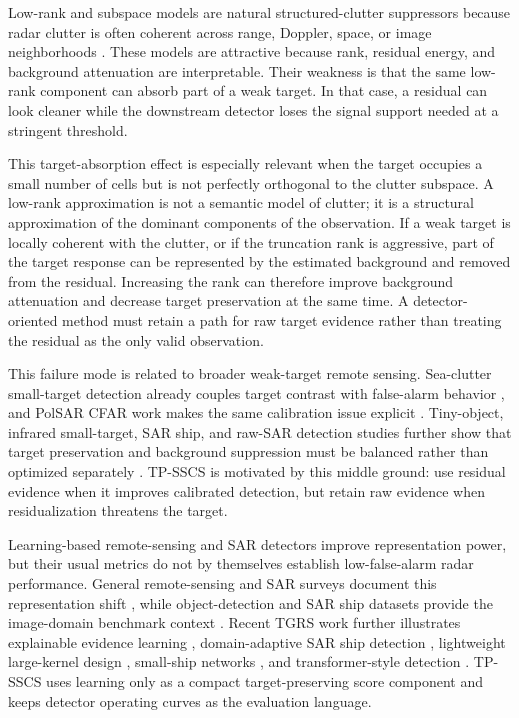 \documentclass[journal]{IEEEtran}
\begin{document}
Low-rank and subspace models are natural structured-clutter suppressors because radar clutter is often coherent across range, Doppler, space, or image neighborhoods \cite{candes2011rpca,vaswani2018robustsubspace}. These models are attractive because rank, residual energy, and background attenuation are interpretable. Their weakness is that the same low-rank component can absorb part of a weak target. In that case, a residual can look cleaner while the downstream detector loses the signal support needed at a stringent threshold.

This target-absorption effect is especially relevant when the target occupies a small number of cells but is not perfectly orthogonal to the clutter subspace. A low-rank approximation is not a semantic model of clutter; it is a structural approximation of the dominant components of the observation. If a weak target is locally coherent with the clutter, or if the truncation rank is aggressive, part of the target response can be represented by the estimated background and removed from the residual. Increasing the rank can therefore improve background attenuation and decrease target preservation at the same time. A detector-oriented method must retain a path for raw target evidence rather than treating the residual as the only valid observation.

This failure mode is related to broader weak-target remote sensing. Sea-clutter small-target detection already couples target contrast with false-alarm behavior \cite{panagopoulos2004smalltarget}, and PolSAR CFAR work makes the same calibration issue explicit \cite{liu2020polsarcfar}. Tiny-object, infrared small-target, SAR ship, and raw-SAR detection studies further show that target preservation and background suppression must be balanced rather than optimized separately \cite{chen2022drenet,liu2025pgdn,wang2019ssdd,leng2023rawsar}. TP-SSCS is motivated by this middle ground: use residual evidence when it improves calibrated detection, but retain raw evidence when residualization threatens the target.

Learning-based remote-sensing and SAR detectors improve representation power, but their usual metrics do not by themselves establish low-false-alarm radar performance. General remote-sensing and SAR surveys document this representation shift \cite{zhu2017deeprs,zhu2021deeplearningsar,eldarymli2016saratr}, while object-detection and SAR ship datasets provide the image-domain benchmark context \cite{zou2018ram,zhang2021ssdd,huang2018opensarship,wei2020hrsid}. Recent TGRS work further illustrates explainable evidence learning \cite{liu2024evidence}, domain-adaptive SAR ship detection \cite{zhou2024fewshot}, lightweight large-kernel design \cite{shen2024ellknet}, small-ship networks \cite{ma2024ssdnet}, and transformer-style detection \cite{qin2025rdbdino}. TP-SSCS uses learning only as a compact target-preserving score component and keeps detector operating curves as the evaluation language.
\end{document}
